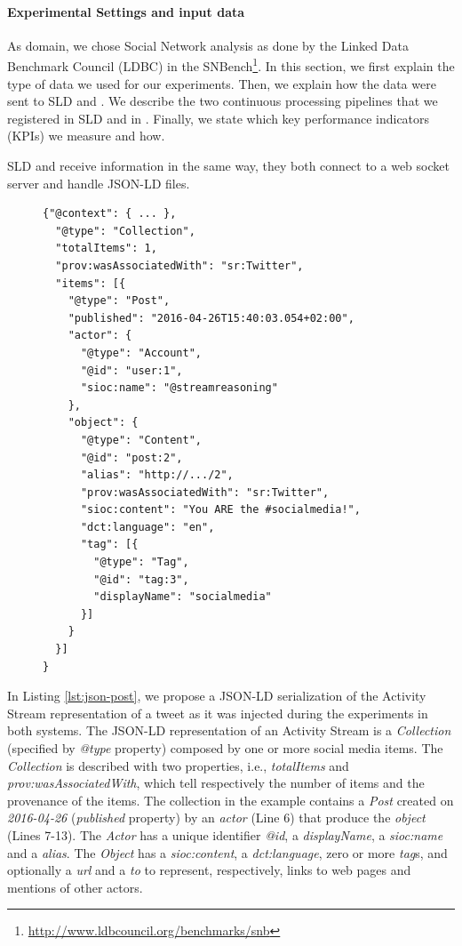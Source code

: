 \paragraph{Experimental Settings and input data}
As domain, we chose Social Network analysis as done by the Linked Data Benchmark Council (LDBC) in the SNBench\footnote{\url{http://www.ldbcouncil.org/benchmarks/snb}}. In this section, we first explain the type of data we used for our experiments. Then, we explain how the data were sent to SLD and \sti{}. We describe the two continuous processing pipelines that we registered in SLD and in \sti{}. Finally, we state which key performance indicators (KPIs) we measure and how.

SLD and \sti{} receive information in the same way, they both connect to a web socket server and handle JSON-LD files. 

\begin{figure}[ht]
\begin{minipage}{0.95\linewidth}
\begin{lstlisting}[caption={JSON representation of a Twitter micro-post. Due to the lack of space we omitted the context declaration that contains the namespace.},label=lst:json-post, style=JSON]
{"@context": { ... }, 
  "@type": "Collection",
  "totalItems": 1,
  "prov:wasAssociatedWith": "sr:Twitter",
  "items": [{
    "@type": "Post",
    "published": "2016-04-26T15:40:03.054+02:00",
    "actor": {
      "@type": "Account",
      "@id": "user:1",
      "sioc:name": "@streamreasoning"
    },
    "object": {
      "@type": "Content",
      "@id": "post:2",
      "alias": "http://.../2",
      "prov:wasAssociatedWith": "sr:Twitter",
      "sioc:content": "You ARE the #socialmedia!",
      "dct:language": "en",
      "tag": [{
        "@type": "Tag",
        "@id": "tag:3",
        "displayName": "socialmedia"
      }]
    }
  }]
}
\end{lstlisting}
\end{minipage}
\end{figure}

In Listing \ref{lst:json-post}, we propose a JSON-LD serialization of the Activity Stream representation of a tweet as it was injected during the experiments in both systems.  
The JSON-LD representation of an Activity Stream is a \textit{Collection} (specified by \textit{@type} property) composed by one or more social media items. The \textit{Collection} is described with two properties, i.e., \textit{totalItems} and \textit{prov:wasAssociatedWith}, which tell respectively the number of items and the provenance of the items. The collection in the example contains a \textit{Post} created on \textit{2016-04-26} (\textit{published} property) by  an \textit{actor} (Line 6) that produce the \textit{object} (Lines 7-13). 
The \textit{Actor} has a unique identifier  \textit{@id}, a \textit{displayName}, a \textit{sioc:name} and a \textit{alias}. The \textit{Object} has a \textit{sioc:content}, a \textit{dct:language}, zero or more \textit{tag}s, and optionally a \textit{url} and a \textit{to} to represent, respectively, links to web pages and mentions of other actors.

